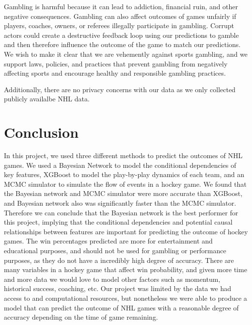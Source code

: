 \documentclass[11pt]{article}
\begin{document}
Gambling is harmful because it can lead to addiction, financial ruin, and other negative consequences. Gambling can also affect outcomes of games unfairly if players, coaches, owners, or referees illegally participate in gambling. Corrupt actors could create a destructive feedback loop using our predictions to gamble and then therefore influence the outcome of the game to match our predictions.
We wish to make it clear that we are vehemently against sports gambling, and we support laws, policies, and practices that prevent gambling from negatively affecting sports and encourage healthy and responsible gambling practices.

Additionally, there are no privacy concerns with our data as we only collected publicly availalbe NHL data.

\section{Conclusion}

In this project, we used three different methods to predict the outcomes of NHL games. We used a Bayesian Network to model the conditional dependencies of key features, XGBoost to model the play-by-play dynamics of each team, and an MCMC simulator to simulate the flow of events in a hockey game. 
We found that the Bayesian network and MCMC simulator were more accurate than XGBoost, and Bayesian network also was significantly faster than the MCMC simulator. Therefore we can conclude that the Bayesian network is the best performer for this project, implying that the conditional dependencies and potential causal relationships between features are important for predicting the outcome of hockey games.
The win percentages predicted are more for entertainment and educational purposes, and should not be used for gambling or performance purposes, as they do not have a incredibly high degree of accuracy. There are many variables in a hockey game that affect win probability, and given more time and more data we would love to model other factors such as momentum, historical success, coaching, etc. Our project was limited by the data
we had access to and computational resources, but nonetheless we were able to produce a model that can predict the outcome of NHL games with a reasonable degree of accuracy depending on the time of game remaining.

\newpage


\end{document}
